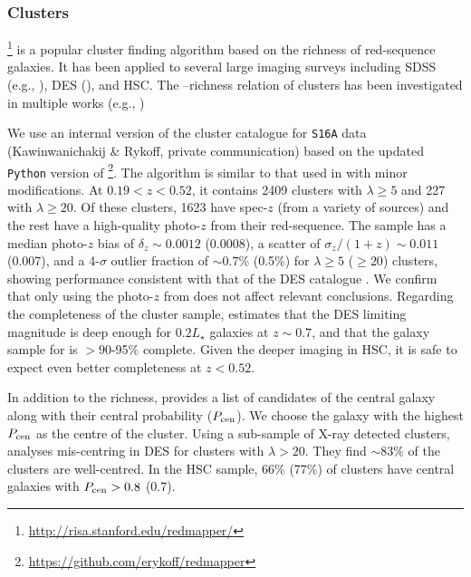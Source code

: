 \documentclass[fleqn,usenatbib,useAMS]{mnras}
\begin{document}
\subsubsection{\redm{} Clusters}
    \label{sec:cluster_redmapper}

    \redm{} \citep{Rykoff2014, Rozo2014, Rozo2015a, Rozo2015b}
    \footnote{\url{http://risa.stanford.edu/redmapper/}} is a popular cluster finding algorithm
    based on the richness of red-sequence galaxies.
    It has been applied to several large imaging surveys including SDSS (e.g.,
    \citealt{Rykoff2014}), DES (\citealt{Rykoff2016, McClintock2019}), and HSC.
    The \mvir{}--richness relation of \redm{} clusters has been investigated in multiple
    works (e.g., \citealt{Saro2015, Farahi2016, Simet2017, Melchior2017, Baxter2018, Murata2018,
    McClintock2019})

    We use an internal version of the \redm{} cluster catalogue for \texttt{S16A} data
    (Kawinwanichakij \& Rykoff, private communication) based on the updated \texttt{Python} version
    of \redm{}\footnote{\url{https://github.com/erykoff/redmapper}}.
    The algorithm is similar to that used in \citet{Rykoff2016} with minor modifications.
    At $0.19 < z < 0.52$, it contains 2409 clusters with $\lambda \geq 5$ and 227 with $\lambda \geq
    20$.
    Of these clusters, 1623 have spec-$z$ (from a variety of sources) and the rest have a
    high-quality photo-$z$ from their red-sequence.
    The sample has a median photo-$z$ bias of $\delta_{z} \sim 0.0012$ (0.0008), a scatter of
    $\sigma_{z}/(1 + z) \sim 0.011$ (0.007), and a 4-$\sigma$ outlier fraction of $\sim 0.7$\%
    (0.5\%) for $\lambda \geq 5$ ($\geq 20$) clusters, showing performance consistent with that of
    the DES catalogue \citep{McClintock2019}.
    We confirm that only using the photo-$z$ from \redm{} does not affect relevant conclusions.
    Regarding the completeness of the cluster sample, \citet{McClintock2019} estimates that
    the DES limiting magnitude is deep enough for $0.2 L_{\star}$ galaxies at $z \sim 0.7$,
    and that the galaxy sample for \redm{} is $>90$-95\% complete.
    Given the deeper imaging in HSC, it is safe to expect even better completeness at $z<0.52$.

    In addition to the richness, \redm{} provides a list of candidates of the central galaxy along
    with their central probability ($P_{\rm cen}$).
    We choose the galaxy with the highest $P_{\rm cen}$ as the centre of the cluster.
    Using a sub-sample of X-ray detected clusters, \citet{Zhang2019b} analyses \redm{} mis-centring
    in DES for clusters with $\lambda > 20$. 
    They find $\sim 83$\% of the clusters are well-centred.
    In the HSC \redm{} sample, 66\% (77\%) of clusters have central galaxies with $P_{\rm cen} >
    0.8$ (0.7).
\end{document}
